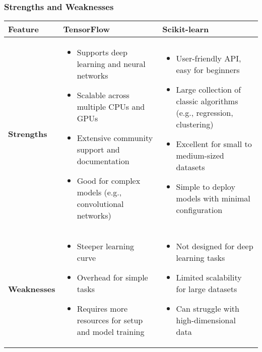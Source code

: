 \documentclass[aspectratio=169]{beamer}
\begin{document}
\begin{frame}[fragile]
    \frametitle{Strengths and Weaknesses}
    \begin{table}[htbp]
        \centering
        \begin{tabular}{|l|l|l|}
            \hline
            \textbf{Feature} & \textbf{TensorFlow} & \textbf{Scikit-learn} \\
            \hline
            \textbf{Strengths} & 
            \begin{itemize}
                \item Supports deep learning and neural networks
                \item Scalable across multiple CPUs and GPUs
                \item Extensive community support and documentation
                \item Good for complex models (e.g., convolutional networks)
            \end{itemize} & 
            \begin{itemize}
                \item User-friendly API, easy for beginners
                \item Large collection of classic algorithms (e.g., regression, clustering)
                \item Excellent for small to medium-sized datasets
                \item Simple to deploy models with minimal configuration
            \end{itemize} \\
            \hline
            \textbf{Weaknesses} & 
            \begin{itemize}
                \item Steeper learning curve
                \item Overhead for simple tasks
                \item Requires more resources for setup and model training
            \end{itemize} & 
            \begin{itemize}
                \item Not designed for deep learning tasks
                \item Limited scalability for large datasets
                \item Can struggle with high-dimensional data
            \end{itemize} \\
            \hline
        \end{tabular}
    \end{table}
\end{frame}
\end{document}
